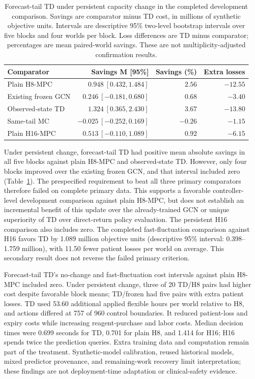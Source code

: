 \documentclass[preprint,review,12pt]{elsarticle}
\begin{document}
\begin{table}[H]
\centering
\caption{Forecast-tail TD under persistent capacity change in the completed
development comparison. Savings are comparator minus TD cost,
in millions of synthetic objective units. Intervals are descriptive 95\%
two-level bootstrap intervals over five blocks and four worlds per block.
Loss differences are TD minus comparator; percentages are mean paired-world
savings. These are not multiplicity-adjusted confirmation results.}
\label{tab:planner-tail-persistent}
\begin{tabularx}{\textwidth}{Xrrr}
\toprule
Comparator & Savings M [95\%] & Savings (\%) & Extra losses \\
\midrule
Plain H8-MPC & $0.948\ [0.432,1.484]$ & $2.56$ & $-12.55$ \\
Existing frozen GCN & $0.246\ [-0.181,0.680]$ & $0.68$ & $-3.40$ \\
Observed-state TD & $1.324\ [0.365,2.430]$ & $3.67$ & $-13.80$ \\
Same-tail MC & $-0.025\ [-0.252,0.169]$ & $-0.26$ & $-1.15$ \\
Plain H16-MPC & $0.513\ [-0.110,1.089]$ & $0.92$ & $-6.15$ \\
\bottomrule
\end{tabularx}
\end{table}

Under persistent change, forecast-tail TD had positive mean absolute savings
in all five blocks against plain H8-MPC and observed-state TD. However, only
four blocks improved over the existing frozen GCN, and that interval included
zero (Table~\ref{tab:planner-tail-persistent}). The prespecified requirement to
beat all three primary comparators therefore failed on complete primary data.
This supports a favorable controller-level development comparison against
plain H8-MPC, but does not establish an incremental benefit of this update
over the already-trained GCN or unique superiority of TD over direct-return
policy evaluation. The persistent H16 comparison also includes zero. The
completed fast-fluctuation comparison against H16 favors TD by 1.089 million
objective units (descriptive 95\% interval: 0.398--1.759 million), with 11.50
fewer patient losses per world on average. This secondary result does not
reverse the failed primary criterion.

Forecast-tail TD's no-change and fast-fluctuation cost intervals against plain
H8-MPC included zero. Under persistent change, three of 20 TD/H8 pairs had
higher cost despite favorable block means; TD/frozen had five pairs with extra
patient losses. TD used 53.60 additional applied flexible hours per world
relative to H8, and actions differed at 757 of 960 control boundaries. It
reduced patient-loss and expiry costs while increasing reagent-purchase and
labor costs. Median decision times were 0.699 seconds for TD, 0.701 for plain
H8, and 1.414 for H16; H16 spends twice the prediction queries. Extra training
data and computation remain part of the treatment. Synthetic-model calibration,
reused historical models, mixed predictor provenance, and remaining-work recovery
limit interpretation; these findings are not deployment-time adaptation or
clinical-safety evidence.
\end{document}
